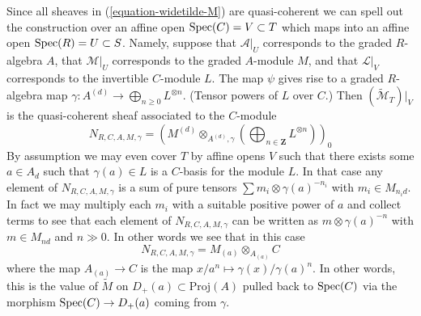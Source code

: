 \medskip\noindent
Since all sheaves in (\ref{equation-widetilde-M}) are quasi-coherent
we can spell out the construction
over an affine open $\mathop{\mathrm{Spec}}(C) = V \subset T$
which maps into an affine open $\mathop{\mathrm{Spec}}(R) = U \subset S$.
Namely, suppose that $\mathcal{A}|_U$ corresponds
to the graded $R$-algebra $A$, that $\mathcal{M}|_U$ corresponds to the
graded $A$-module $M$, and that $\mathcal{L}|_V$ corresponds to the
invertible $C$-module $L$. The map $\psi$ gives
rise to a graded $R$-algebra map
$\gamma : A^{(d)} \to \bigoplus_{n \geq 0} L^{\otimes n}$.
(Tensor powers of $L$ over $C$.)
Then $(\widetilde{\mathcal{M}}_T)|_V$
is the quasi-coherent sheaf associated to the $C$-module
$$
N_{R, C, A, M, \gamma} =
\left(
M^{(d)} \otimes_{A^{(d)}, \gamma}
\left(\bigoplus\nolimits_{n \in \mathbf{Z}} L^{\otimes n}\right)
\right)_0
$$
By assumption we may even cover $T$ by affine opens
$V$ such that there exists some $a \in A_d$ such that
$\gamma(a) \in L$ is a $C$-basis for the module $L$.
In that case any element of $N_{R, C, A, M, \gamma}$ is a sum
of pure tensors $\sum m_i \otimes \gamma(a)^{-n_i}$ with $m_i \in M_{n_id}$.
In fact we may multiply each $m_i$ with a suitable positive power
of $a$ and collect terms to see that each element of $N_{R, C, A, M, \gamma}$
can be written as $m \otimes \gamma(a)^{-n}$ with $m \in M_{nd}$ and
$n \gg 0$. In other words we see that in this case
$$
N_{R, C, A, M, \gamma} = M_{(a)} \otimes_{A_{(a)}} C
$$
where the map $A_{(a)} \to C$ is the map
$x/a^n \mapsto \gamma(x)/\gamma(a)^n$. In other words, this is
the value of $\widetilde{M}$ on $D_{+}(a) \subset \text{Proj}(A)$
pulled back to $\mathop{\mathrm{Spec}}(C)$ via the morphism
$\mathop{\mathrm{Spec}}(C) \to D_{+}(a)$ coming from $\gamma$.


